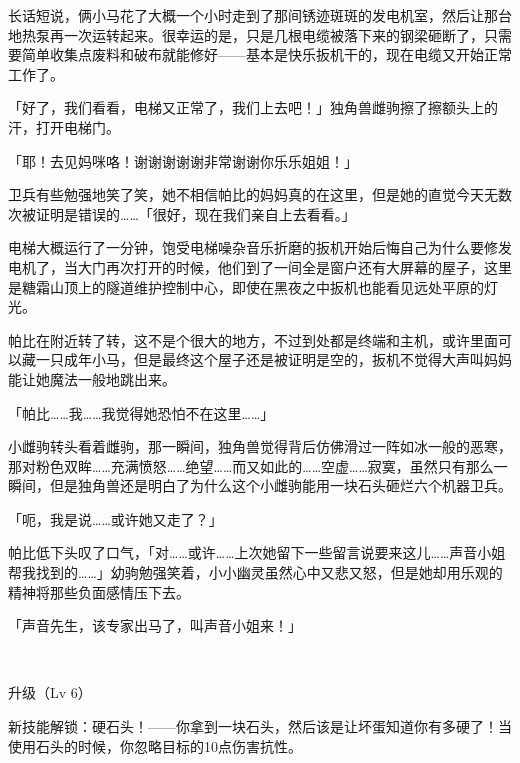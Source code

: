\horizonline


长话短说，俩小马花了大概一个小时走到了那间锈迹斑斑的发电机室，然后让那台地热泵再一次运转起来。很幸运的是，只是几根电缆被落下来的钢梁砸断了，只需要简单收集点废料和破布就能修好——基本是快乐扳机干的，现在电缆又开始正常工作了。

「好了，我们看看，电梯又正常了，我们上去吧！」独角兽雌驹擦了擦额头上的汗，打开电梯门。

「耶！去见妈咪咯！谢谢谢谢谢非常谢谢你乐乐姐姐！」

卫兵有些勉强地笑了笑，她不相信帕比的妈妈真的在这里，但是她的直觉今天无数次被证明是错误的……「很好，现在我们亲自上去看看。」


电梯大概运行了一分钟，饱受电梯噪杂音乐折磨的扳机开始后悔自己为什么要修发电机了，当大门再次打开的时候，他们到了一间全是窗户还有大屏幕的屋子，这里是糖霜山顶上的隧道维护控制中心，即使在黑夜之中扳机也能看见远处平原的灯光。

帕比在附近转了转，这不是个很大的地方，不过到处都是终端和主机，或许里面可以藏一只成年小马，但是最终这个屋子还是被证明是空的，扳机不觉得大声叫妈妈能让她魔法一般地跳出来。

「帕比……我……我觉得她恐怕不在这里……」

小雌驹转头看着雌驹，那一瞬间，独角兽觉得背后仿佛滑过一阵如冰一般的恶寒，那对粉色双眸……充满愤怒……绝望……而又如此的……空虚……寂寞，虽然只有那么一瞬间，但是独角兽还是明白了为什么这个小雌驹能用一块石头砸烂六个机器卫兵。

「呃，我是说……或许她又走了？」

帕比低下头叹了口气，「对……或许……上次她留下一些留言说要来这儿……声音小姐帮我找到的……」幼驹勉强笑着，小小幽灵虽然心中又悲又怒，但是她却用乐观的精神将那些负面感情压下去。

「声音先生，该专家出马了，叫声音小姐来！」

~\vfill

\begin{note}
    升级（Lv 6）

    新技能解锁：硬石头！——你拿到一块石头，然后该是让坏蛋知道你有多硬了！当使用石头的时候，你忽略目标的10点伤害抗性。
\end{note}




